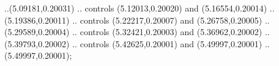 ..(5.09181,0.20031) .. controls (5.12013,0.20020) and (5.16554,0.20014) ..(5.19386,0.20011) .. controls (5.22217,0.20007) and (5.26758,0.20005) ..(5.29589,0.20004) .. controls (5.32421,0.20003) and (5.36962,0.20002) ..(5.39793,0.20002) .. controls (5.42625,0.20001) and (5.49997,0.20001) ..(5.49997,0.20001);
